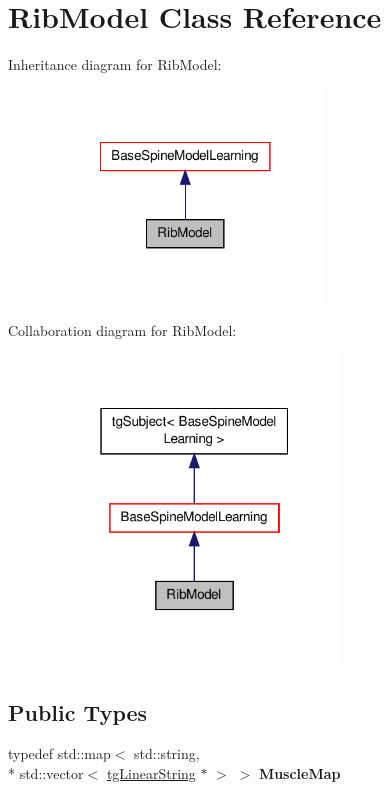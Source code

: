 \hypertarget{class_rib_model}{\section{Rib\-Model Class Reference}
\label{class_rib_model}
}


Inheritance diagram for Rib\-Model\-:\nopagebreak
\begin{figure}[H]
\begin{center}
\leavevmode
\includegraphics[width=206pt]{class_rib_model__inherit__graph}
\end{center}
\end{figure}


Collaboration diagram for Rib\-Model\-:\nopagebreak
\begin{figure}[H]
\begin{center}
\leavevmode
\includegraphics[width=220pt]{class_rib_model__coll__graph}
\end{center}
\end{figure}
\subsection*{Public Types}
\begin{DoxyCompactItemize}
\item 
\hypertarget{class_base_spine_model_learning_a0f779ad979f0353d68af012f50f822b7}{typedef std\-::map$<$ std\-::string, \\*
std\-::vector$<$ \hyperlink{classtg_linear_string}{tg\-Linear\-String} $\ast$ $>$ $>$ {\bfseries Muscle\-Map}}\label{class_base_spine_model_learning_a0f779ad979f0353d68af012f50f822b7}

\end{DoxyCompactItemize}

